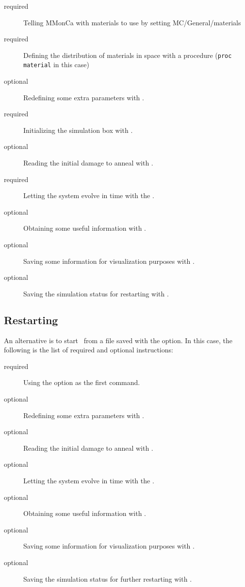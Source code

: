 \begin{description}
\item [required] Telling MMonCa with materials to use by setting {\param MC/General/materials}
\item [required] Defining the distribution of materials in space with a procedure ({\tt proc material} in this case)
\item [optional] Redefining some extra parameters with .
\item [required] Initializing the simulation box with .
\item [optional] Reading the initial damage to anneal with .
\item [required] Letting the system evolve in time with the .
\item [optional] Obtaining some useful information with .
\item [optional] Saving some information for visualization purposes with .
\item [optional] Saving the simulation status for restarting with .
\end{description}

\subsection{Restarting}

An alternative is to start \MMonCa\ from a file saved with the  option. In this case, the following is the list of required and optional instructions:
\begin{description}
\item [required] Using the  option as the first command.
\item [optional] Redefining some extra parameters with .
\item [optional] Reading the initial damage to anneal with .
\item [optional] Letting the system evolve in time with the .
\item [optional] Obtaining some useful information with .
\item [optional] Saving some information for visualization purposes with .
\item [optional] Saving the simulation status for further restarting with .
\end{description}


